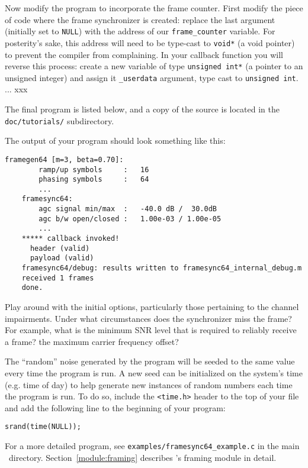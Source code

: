 Now modify the program to incorporate the frame counter.
First modify the piece of code where the frame synchronizer is created:
replace the last argument (initially set to {\tt NULL}) with the address
of our {\tt frame\_counter} variable.
For posterity's sake, this address will need to be type-cast to
{\tt void*} (a void pointer) to prevent the compiler from complaining.
In your callback function you will reverse this process:
create a new variable of type {\tt unsigned int*}
(a pointer to an unsigned integer)
and assign it {\tt \_userdata} argument, type cast to
{\tt unsigned int}.
... xxx



The final program is listed below,
and a copy of the source is located in the {\tt doc/tutorials/}
subdirectory.
%

%
The output of your program should look something like this:
%
\begin{Verbatim}[fontsize=\small]
    framegen64 [m=3, beta=0.70]:
        ramp/up symbols     :   16
        phasing symbols     :   64
        ...
    framesync64:
        agc signal min/max  :   -40.0 dB /  30.0dB
        agc b/w open/closed :   1.00e-03 / 1.00e-05
        ...
    ***** callback invoked!
      header (valid)
      payload (valid)
    framesync64/debug: results written to framesync64_internal_debug.m
    received 1 frames
    done.
\end{Verbatim}
%
Play around with the initial options, particularly those pertaining to
the channel impairments.
Under what circumstances does the synchronizer miss the frame?
For example, what is the minimum SNR level that is required to reliably
receive a frame?
the maximum carrier frequency offset?

The ``random'' noise generated by the program will be seeded to the same
value every time the program is run.
A new seed can be initialized on the system's time (e.g. time of day) to
help generate new instances of random numbers each time the program is
run.
To do so, include the {\tt <time.h>} header to the top of your file and
add the following line to the beginning of your program:
%
\begin{Verbatim}[fontsize=\small]
    srand(time(NULL));
\end{Verbatim}
%

For a more detailed program, see {\tt examples/framesync64\_example.c}
in the main \liquid\ directory.
Section~\ref{module:framing} describes \liquid's framing module in
detail.


